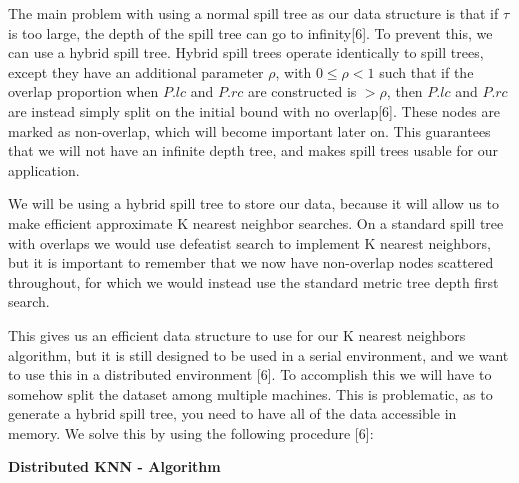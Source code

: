 \vspace{5 mm}
\noindent
The main problem with using a normal spill tree as our data structure is that if
$\tau$ is too large, the depth of the spill tree can go to infinity[6].  To prevent
this, we can use a hybrid spill tree.  Hybrid spill trees operate identically to
spill trees, except they have an additional parameter $\rho$, with $0 \le \rho <
1$  such that if the overlap proportion when $P.lc$ and $P.rc$ are constructed
is  $> \rho$, then $P.lc$ and $P.rc$ are instead simply split on the initial
bound with no overlap[6].  These nodes are marked as non-overlap, which will
become  important later on.  This guarantees that we will not have an infinite
depth  tree, and makes spill trees usable for our application.

\vspace{5 mm}
\noindent
We will be using a hybrid spill tree to store our data, because it will allow us
to make efficient approximate K nearest neighbor searches.  On a standard spill
tree with overlaps we would use defeatist search to implement K nearest
neighbors,  but it is important to remember that we now have non-overlap nodes
scattered  throughout, for which we would instead use the standard metric tree
depth first search.

\vspace{5 mm}
\noindent
This gives us an efficient data structure to use for our K nearest neighbors
algorithm, but it is still designed to be used in a serial environment, and we
want to use this in a distributed environment [6].  To accomplish this we will have
to somehow split the dataset among multiple machines.  This is problematic, as
to generate a hybrid spill tree, you need to have all of the data accessible in
memory.  We solve this by using the following procedure [6]:

\vspace{5 mm}
\noindent
\textbf{Distributed KNN - Algorithm}

